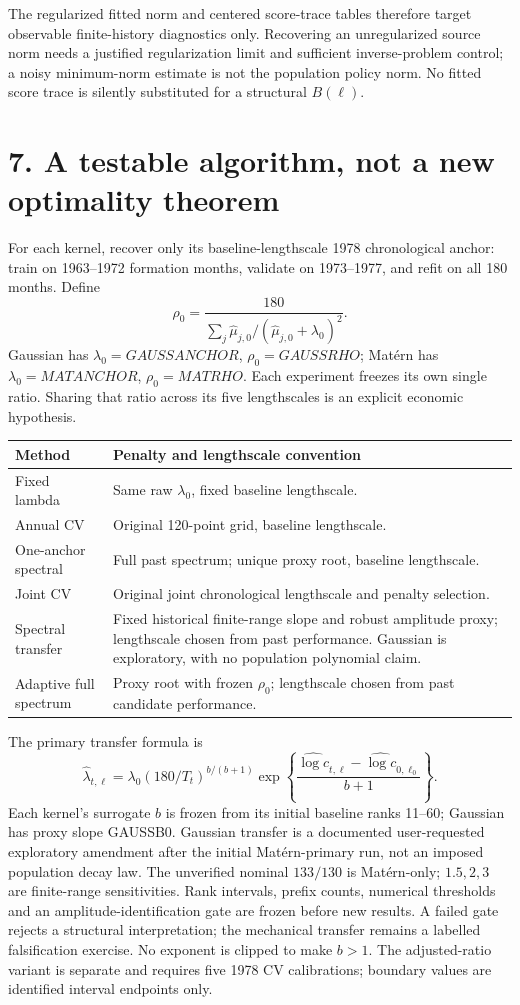 \documentclass[11pt,letterpaper]{article}
\begin{document}
The regularized fitted norm and centered score-trace tables therefore target
observable finite-history diagnostics only. Recovering an unregularized source
norm needs a justified regularization limit and sufficient inverse-problem
control; a noisy minimum-norm estimate is not the population policy norm.
No fitted score trace is silently substituted for a structural $B(\ell)$.

\newpage
\section*{7. A testable algorithm, not a new optimality theorem}
For each kernel, recover only its baseline-lengthscale 1978 chronological
anchor: train on 1963--1972 formation months, validate on 1973--1977, and refit
on all 180 months. Define
\[
 \rho_0=\frac{180}{\sum_j\widehat\mu_{j,0}/(\widehat\mu_{j,0}+\lambda_0)^2}.
\]
Gaussian has $\lambda_0=GAUSSANCHOR$, $\rho_0=GAUSSRHO$;
Mat\'ern has $\lambda_0=MATANCHOR$, $\rho_0=MATRHO$.
Each experiment freezes its own single ratio. Sharing that ratio across its
five lengthscales is an explicit economic hypothesis.

\begin{center}\small
\begin{tabular}{p{.23\linewidth}p{.68\linewidth}}
\toprule Method & Penalty and lengthscale convention\\\midrule
Fixed lambda & Same raw $\lambda_0$, fixed baseline lengthscale.\\
Annual CV & Original 120-point grid, baseline lengthscale.\\
One-anchor spectral & Full past spectrum; unique proxy root, baseline lengthscale.\\
Joint CV & Original joint chronological lengthscale and penalty selection.\\
Spectral transfer & Fixed historical finite-range slope and robust amplitude proxy; lengthscale chosen from past performance. Gaussian is exploratory, with no population polynomial claim.\\
Adaptive full spectrum & Proxy root with frozen $\rho_0$; lengthscale chosen from past candidate performance.\\\bottomrule
\end{tabular}
\end{center}
The primary transfer formula is
\[
 \widehat\lambda_{t,\ell}=\lambda_0(180/T_t)^{b/(b+1)}
 \exp\!\left\{\frac{\widehat{\log c}_{t,\ell}-\widehat{\log c}_{0,\ell_0}}{b+1}\right\}.
\]
Each kernel's surrogate $b$ is frozen from its initial baseline ranks 11--60;
Gaussian has proxy slope GAUSSB0. Gaussian transfer is a documented user-requested
exploratory amendment after the initial Mat\'ern-primary run, not an imposed
population decay law. The unverified nominal $133/130$ is Mat\'ern-only;
$1.5,2,3$ are finite-range sensitivities.
Rank intervals, prefix counts, numerical thresholds and an amplitude-identification
gate are frozen before new results. A failed gate rejects a structural interpretation;
the mechanical transfer remains a labelled falsification exercise. No exponent is
clipped to make $b>1$. The adjusted-ratio variant is separate and requires five
1978 CV calibrations; boundary values are identified interval endpoints only.
\end{document}
